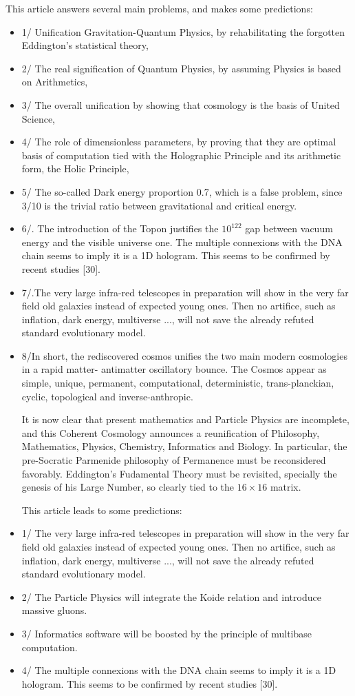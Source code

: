 \documentclass[twoside,draft]{article}
\begin{document}
\begin{sloppypar}
{This article answers several main problems, and makes some predictions: 
\begin{itemize}
\item 1/ Unification Gravitation-Quantum Physics, by
rehabilitating the forgotten Eddington's statistical theory, 
\item 2/ The real signification of Quantum
Physics, by assuming Physics is based on Arithmetics, 
\item 3/ The overall unification by showing that
cosmology is the basis of United Science, 
\item 4/ The role of dimensionless parameters, by proving that
they are optimal basis of computation tied with the Holographic Principle and its arithmetic form,
the Holic Principle, 
\item 5/ The so-called Dark energy proportion 0.7, which is a false problem, since
3/10 is the trivial ratio between gravitational and critical energy. 
\item 6/. The introduction of the Topon
justifies the $10^{122}$ gap between vacuum energy and the visible universe one.
The multiple connexions with the DNA chain seems to imply it is a 1D hologram. This seems to
be confirmed by recent studies [30].
\item 7/.The very large infra-red telescopes in preparation will show in the very far field old galaxies
instead of expected young ones. Then no artifice, such as inflation, dark energy, multiverse ..., will
not save the already refuted standard evolutionary model.
\item 8/In short, the rediscovered cosmos unifies the two main modern cosmologies in a rapid matter-
antimatter oscillatory bounce. The Cosmos appear as simple, unique, permanent, computational,
deterministic, trans-planckian, cyclic, topological and inverse-anthropic.

It is now clear that present mathematics and Particle Physics are incomplete, and this Coherent Cosmology announces a reunification of Philosophy, Mathematics, Physics, Chemistry, Informatics and Biology. In particular, the pre-Socratic Parmenide philosophy of Permanence must be reconsidered favorably. Eddington's Fudamental Theory must be revisited, specially the genesis of his Large Number, so clearly tied to the $16 \times 16$ matrix.

      This article leads to some predictions:
\item 1/  The very large infra-red telescopes in preparation will show in the very far field old galaxies instead of expected young ones. Then no artifice, such as inflation, dark energy, multiverse ..., will not save the already refuted standard evolutionary model.
\item 2/ The Particle Physics will integrate the Koide relation and introduce massive gluons.
\item 3/ Informatics software will be boosted by the principle of multibase computation.
\item 4/ The multiple connexions with the DNA chain seems to imply it is a 1D hologram. This seems to be confirmed by recent studies [30]. 
\end{itemize}


}
\end{sloppypar}
\end{document}

